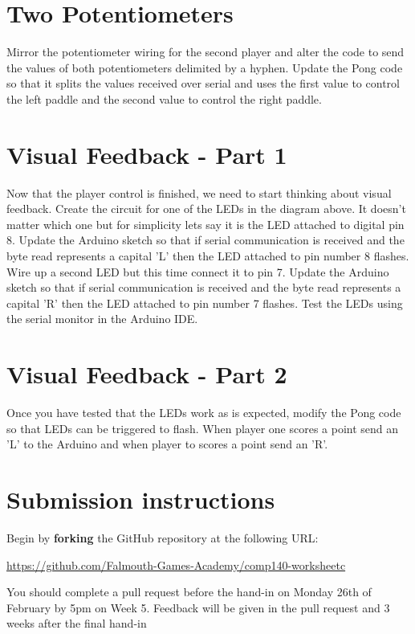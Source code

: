 \documentclass{../../../fal_assignment}
\begin{document}
\section{Two Potentiometers} \label{arduino-second}
Mirror the potentiometer wiring for the second player and alter the code to send the values of both potentiometers delimited by a hyphen. Update the Pong code so that it splits the values received over serial and uses the first value to control the left paddle and the second value to control the right paddle. 

\section{Visual Feedback - Part 1} \label{arduino-third}
Now that the player control is finished, we need to start thinking about visual feedback. Create the circuit for one of the LEDs in the diagram above. It doesn't matter which one but for simplicity lets say it is the LED attached to digital pin 8. Update the Arduino sketch so that if serial communication is received and the byte read represents a capital 'L' then the LED attached to pin number 8 flashes. Wire up a second LED but this time connect it to pin 7. Update the Arduino sketch so that if serial communication is received and the byte read represents a capital 'R' then the LED attached to pin number 7 flashes. Test the LEDs using the serial monitor in the Arduino IDE. 

\section{Visual Feedback - Part 2} \label{arduino-fourth}
Once you have tested that the LEDs work as is expected, modify the Pong code so that LEDs can be triggered to flash. When player one scores a point send an 'L' to the Arduino and when player to scores a point send an 'R'.



\section*{Submission instructions}

Begin by \textbf{forking} the GitHub repository at the following URL:

\url{https://github.com/Falmouth-Games-Academy/comp140-worksheetc}

You should complete a pull request before the hand-in on Monday 26th of February by 5pm on Week 5. Feedback will be given in the pull request and 3 weeks after the final hand-in
\end{document}
